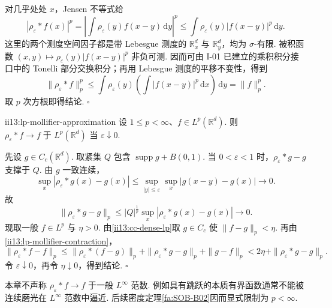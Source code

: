 \begin{FAProof}
对几乎处处 \(\displaystyle x\)，Jensen 不等式给
\[
|\rho_\varepsilon*f(x)|^p
=
\left|\int\rho_\varepsilon(y)f(x-y)\,\mathrm{d}y\right|^p
\leqslant
\int\rho_\varepsilon(y)|f(x-y)|^p\,\mathrm{d}y.
\]
这里的两个测度空间因子都是带 Lebesgue 测度的 \(\displaystyle\mathbb R_x^d\) 与 \(\displaystyle\mathbb R_y^d\)，均为 \(\displaystyle\sigma\)-有限. 被积函数 \(\displaystyle (x,y)\longmapsto\rho_\varepsilon(y)|f(x-y)|^p\)
非负可测. 因而可由 I-01 已建立的乘积积分接口中的 Tonelli 部分交换积分；再用 Lebesgue 测度的平移不变性，得到
\[
\|\rho_\varepsilon*f\|_p^p
\leqslant
\int\rho_\varepsilon(y)
\left(\int|f(x-y)|^p\,\mathrm{d}x\right)\,\mathrm{d}y
=
\|f\|_p^p.
\]
取 \(\displaystyle p\) 次方根即得结论.
\hfill\(\square\)
\end{FAProof}

\begin{FALemma}{ii13:lp-mollifier-approximation}
设 \(\displaystyle1\leqslant p<\infty\)、\(\displaystyle f\in L^p(\mathbb R^d)\). 则 \(\displaystyle \rho_\varepsilon*f \longrightarrow f \;\text{于 }L^p(\mathbb R^d)\)
当 \(\displaystyle\varepsilon\downarrow0\).
\end{FALemma}

\begin{FAProof}
先设 \(\displaystyle g\in C_c(\mathbb R^d)\). 取紧集 \(\displaystyle Q\) 包含 \(\displaystyle\operatorname{supp}g+B(0,1)\). 当 \(\displaystyle0<\varepsilon<1\) 时，\(\displaystyle\rho_\varepsilon*g-g\) 支撑于 \(\displaystyle Q\). 由 \(\displaystyle g\) 一致连续，
\[
\sup_x|\rho_\varepsilon*g(x)-g(x)|
\leqslant
\sup_{|y|\leqslant\varepsilon}\sup_x|g(x-y)-g(x)|
\longrightarrow0.
\]
故
\[
\|\rho_\varepsilon*g-g\|_p
\leqslant
|Q|^{\frac{1}{p}}
\sup_x|\rho_\varepsilon*g(x)-g(x)|
\longrightarrow0.
\]
现取一般 \(\displaystyle f\in L^p\) 与 \(\displaystyle\eta>0\). 由\autoref{ii13:cc-dense-lp}取 \(\displaystyle g\in C_c\) 使 \(\displaystyle\|f-g\|_p<\eta\). 再由\autoref{ii13:lp-mollifier-contraction}，
\[
\|\rho_\varepsilon*f-f\|_p
\leqslant
\|\rho_\varepsilon*(f-g)\|_p
+
\|\rho_\varepsilon*g-g\|_p
+
\|g-f\|_p
<
2\eta+\|\rho_\varepsilon*g-g\|_p.
\]
令 \(\displaystyle\varepsilon\downarrow0\)，再令 \(\displaystyle\eta\downarrow0\)，得到结论.
\hfill\(\square\)
\end{FAProof}

\begin{FAWarning}[\(\displaystyle p=\infty\) 不在上述范数逼近结论中]
本章不声称 \(\displaystyle\rho_\varepsilon*f\to f\) 于一般 \(\displaystyle L^\infty\) 范数. 例如具有跳跃的本质有界函数通常不能被连续磨光在 \(\displaystyle L^\infty\) 范数中逼近. 后续密度定理\autoref{fa:SOB-B02}因而显式限制为 \(\displaystyle p<\infty\).
\end{FAWarning}

